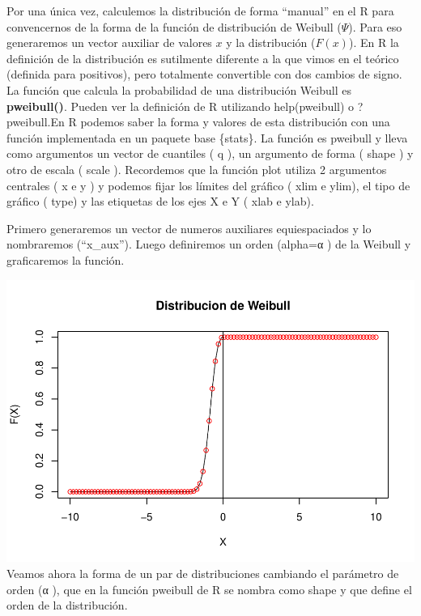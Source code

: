 \documentclass[
  12pt]{article}
\begin{document}
Por una única vez, calculemos la distribución de forma ``manual'' en el
R para convencernos de la forma de la función de distribución de Weibull
(\(\Psi\)). Para eso generaremos un vector auxiliar de valores \(x\) y
la distribución (\(F(x)\)). En R la definición de la distribución es
sutilmente diferente a la que vimos en el teórico (definida para
positivos), pero totalmente convertible con dos cambios de signo. La
función que calcula la probabilidad de una distribución Weibull es
\textbf{pweibull()}. Pueden ver la definición de R utilizando
help(pweibull) o ?pweibull.En R podemos saber la forma y valores de esta
distribución con una función implementada en un paquete base \{stats\}.
La función es pweibull y lleva como argumentos un vector de cuantiles (
q ), un argumento de forma ( shape ) y otro de escala ( scale ).
Recordemos que la función plot utiliza 2 argumentos centrales ( x e y )
y podemos fijar los límites del gráfico ( xlim e ylim), el tipo de
gráfico ( type) y las etiquetas de los ejes X e Y ( xlab e ylab).

Primero generaremos un vector de numeros auxiliares equiespaciados y lo
nombraremos (``x\_aux''). Luego definiremos un orden (alpha=α ) de la
Weibull y graficaremos la función.

\includegraphics{extremales_files/figure-latex/unnamed-chunk-17-1.pdf}
Veamos ahora la forma de un par de distribuciones cambiando el parámetro
de orden (α ), que en la función pweibull de R se nombra como shape y
que define el orden de la distribución.
\end{document}
